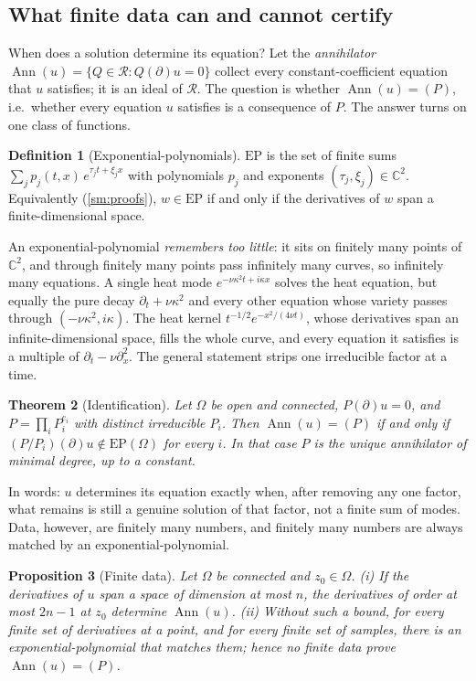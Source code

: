 \documentclass[11pt]{article}
\theoremstyle{plain}
\newtheorem{theorem}{Theorem}[section]
\newtheorem{proposition}[theorem]{Proposition}
\theoremstyle{definition}
\newtheorem{definition}[theorem]{Definition}
\theoremstyle{remark}
\newcommand{\C}{\mathbb{C}}
\newcommand{\ring}{\mathcal{R}}            %
\DeclareMathOperator{\Ann}{Ann}             %
\newcommand{\EP}{\mathrm{EP}}               %
\newcommand{\SMproofs}{\cref{sm:proofs}}
\begin{document}
\subsection{What finite data can and cannot certify}\label{sec:certify}
When does a solution determine its equation? Let the \emph{annihilator} $\Ann(u)=\{Q\in\ring:Q(\partial)u=0\}$ collect
every constant-coefficient equation that $u$ satisfies; it is an ideal of $\ring$. The question is whether
$\Ann(u)=(P)$, i.e.\ whether every equation $u$ satisfies is a consequence of $P$. The answer turns on one class of
functions.

\begin{definition}[Exponential-polynomials]\label{def:ep}
$\EP$ is the set of finite sums $\sum_jp_j(t,x)\,e^{\tau_jt+\xi_jx}$ with polynomials $p_j$ and exponents
$(\tau_j,\xi_j)\in\C^2$. Equivalently (\SMproofs), $w\in\EP$ if and only if the derivatives of $w$ span a
finite-dimensional space.
\end{definition}

An exponential-polynomial \emph{remembers too little}: it sits on finitely many points of $\C^2$, and through finitely
many points pass infinitely many curves, so infinitely many equations. A single heat mode $e^{-\nu\kappa^2t+i\kappa x}$
solves the heat equation, but equally the pure decay $\partial_t+\nu\kappa^2$ and every other equation whose variety
passes through $(-\nu\kappa^2,i\kappa)$. The heat kernel $t^{-1/2}e^{-x^2/(4\nu t)}$, whose derivatives span an
infinite-dimensional space, fills the whole curve, and every equation it satisfies is a multiple of $\partial_t-\nu\partial_x^2$.
The general statement strips one irreducible factor at a time.

\begin{theorem}[Identification]\label{thm:ident}
Let $\Omega$ be open and connected, $P(\partial)u=0$, and $P=\prod_iP_i^{e_i}$ with distinct irreducible $P_i$. Then
$\Ann(u)=(P)$ if and only if $(P/P_i)(\partial)u\notin\EP(\Omega)$ for every $i$. In that case $P$ is the unique
annihilator of minimal degree, up to a constant.
\end{theorem}

In words: $u$ determines its equation exactly when, after removing any one factor, what remains is still a genuine
solution of that factor, not a finite sum of modes. Data, however, are finitely many numbers, and finitely many numbers
are always matched by an exponential-polynomial.

\begin{proposition}[Finite data]\label{prop:certify}
Let $\Omega$ be connected and $z_0\in\Omega$. (i) If the derivatives of $u$ span a space of dimension at most $n$, the
derivatives of order at most $2n-1$ at $z_0$ determine $\Ann(u)$. (ii) Without such a bound, for every finite set of
derivatives at a point, and for every finite set of samples, there is an exponential-polynomial that matches them; hence
no finite data prove $\Ann(u)=(P)$.
\end{proposition}
\end{document}
